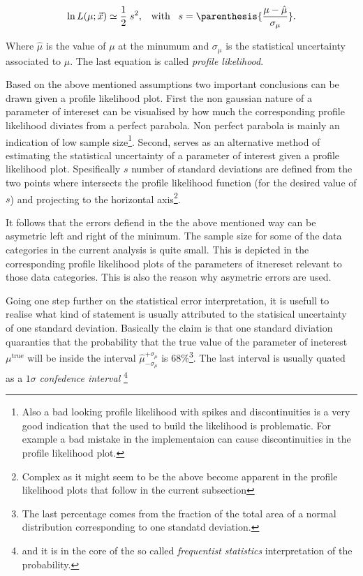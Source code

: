 \begin{equation}
\ln L(\mu;\vec{x}) \simeq \frac{1}{2} \; s^2, \;\;\; \text{with} \;\;\; s = \parenthesis{\frac{\mu-\hat{\mu}}{\sigma_{\mu}}}.
\label{likelihood_exp}
\end{equation}

\noindent Where $\hat{\mu}$ is the value of $\mu$ at the minumum and $\sigma_{\mu}$ is the statistical uncertainty associated
to $\mu$. The last equation is called {\it profile likelihood}.

Based on the above mentioned assumptions two important conclusions can be drawn given a profile likelihood plot. First the non 
gaussian nature of a parameter of intereset can be visualised by how much the corresponding profile likelihood diviates from
a perfect parabola. Non perfect parabola is mainly an indication of low sample 
size\footnote{Also a bad looking profile likelihood with spikes and discontinuities is a very good indication that the \pdf
used to build the likelihood is problematic. For example a bad mistake in the implementaion can cause discontinuities in the
profile likelihood plot.}. Second,  serves as an alternative method of estimating the statistical uncertainty
of a parameter of interest given a profile likelihood plot. Spesifically $s$ number of standard deviations are defined from the two 
points where  intersects the profile likelihood function (for the desired value of $s$) and projecting to 
the horizontal 
axis\footnote{Complex as it might seem to be the above become apparent in the profile likelihood plots that follow in the current subsection}. 

It follows that the errors defiend in the the above mentioned way can be asymetric left and right of the minimum. 
The sample size for some of the data categories in the current analysis is quite small. This is depicted in the corresponding profile 
likelihood plots of the parameters of itnereset relevant to those data categories. This is also the reason why asymetric errors are used. 

Going one step further on the statistical error interpretation, it is usefull to realise what kind of statement is usually
attributed to the statisical uncertainty of one standard deviation. Basically the claim is that one standard diviation
quaranties that the probability that the true value of the parameter of ineterest $\mu^{\text{true}}$ will be inside the
interval $\hat{\mu}_{-\sigma_\mu}^{+\sigma_\mu}$ is $68\%$\footnote{The last percentage comes from the fraction of the total area of a normal distribution corresponding to one standatd deviation.}.
The last interval is usually quated as a $1\sigma$ {\it confedence interval} \footnote{and it is in the core of the so called {\it frequentist statistics}
interpretation of the probability.}

